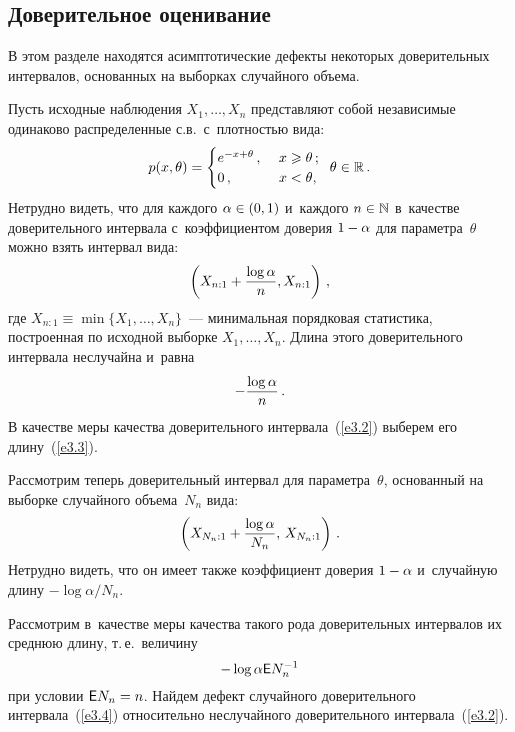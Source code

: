 \begin{multicols}{2}
\section{Доверительное оценивание}

В этом разделе находятся асимптотические дефекты некоторых доверительных 
интервалов, основанных на выборках случайного объема.

Пусть исходные наблюдения $X_1,\ldots,X_n$ представляют собой независимые 
одинаково распределенные с.в.\ с~плотностью вида:
\begin{equation}
p(x,\theta) = \begin{cases}
e^{-x + \theta}\,, &\  x \geqslant \theta\,;\\
0\,, &\  x < \theta,
\end{cases}\enskip
\theta \in \mathbb{R}\,.
\label{e3.1}
\end{equation}
Нетрудно видеть, что для каждого $\alpha\hm \in (0,1)$ и~каж\-до\-го 
$n\hm \in \mathbb{N}$ 
в~качестве доверительного интервала с~коэффициентом доверия $1\hm - \alpha$ для 
параметра~$\theta$ можно взять интервал вида:
\begin{equation}
\left(X_{n:1} + \displaystyle\frac{\displaystyle \log\alpha\mathstrut}{\displaystyle n\mathstrut}, X_{n:1}\right)\,,
\label{e3.2}
\end{equation}
где $X_{n:1} \equiv \min\{X_1,\ldots,X_n\}$~--- 
минимальная порядковая статистика, построенная по исходной выборке
$X_1,\ldots,X_n$.
Длина этого доверительного интервала неслучайна и~равна
\begin{equation}
-\displaystyle\frac{\displaystyle \log\alpha\mathstrut}{\displaystyle n\mathstrut}\,.
\label{e3.3}
\end{equation}
В качестве меры качества доверительного интервала~(\ref{e3.2}) 
выберем его длину~(\ref{e3.3}).

Рассмотрим теперь доверительный интервал для параметра~$\theta$, 
основанный на выборке случайного объема~$N_n$ вида:
\begin{equation}
\left(X_{N_n:1} + \displaystyle\frac{\displaystyle \log\alpha\mathstrut}{\displaystyle N_n\mathstrut},\, X_{N_n:1}\right)\,.
\label{e3.4}
\end{equation}
Нетрудно видеть, что он имеет также коэффициент доверия 
$1\hm - \alpha$ и~случайную длину
$-{\log\alpha}/{N_n}$.

Рассмотрим в~качестве меры качества такого рода доверительных интервалов 
их среднюю длину, т.\,е.\ величину
\begin{equation}
-\log\alpha {\sf E} N_n^{-1}
\label{e3.5}
\end{equation}
при условии ${\sf E} N_n \hm= n$.
Найдем дефект случайного доверительного интервала~(\ref{e3.4}) 
относительно неслучайного доверительного интервала~(\ref{e3.2}).


\end{multicols}
